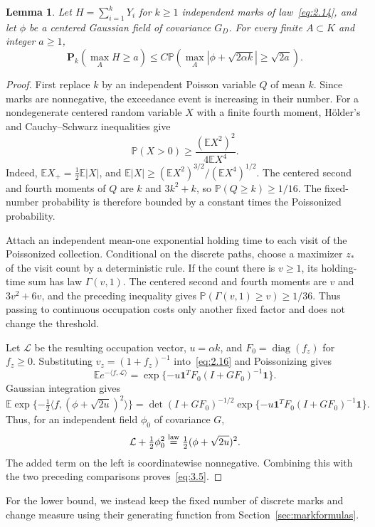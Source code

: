 \documentclass[11pt,letterpaper,reqno]{amsart}
\numberwithin{equation}{section}
\newtheorem{lemma}[theorem]{Lemma}
\theoremstyle{remark}
\begin{document}
\begin{lemma}\label{lem:oneway}
Let $H=\sum_{i=1}^kY_i$ for $k\ge1$ independent marks of law~\eqref{eq:2.14}, and let $\phi$ be a centered Gaussian field of covariance $G_D$. For every finite $A\subset K$ and integer $a\ge1$,
\begin{equation}\label{eq:3.5}
\mathbf P_k(\max_AH\ge a)
\le C\mathbb P\left(\max_A|\phi+\sqrt{2\alpha k}|\ge\sqrt{2a}\right).
\end{equation}
\end{lemma}
\begin{proof}
First replace $k$ by an independent Poisson variable $Q$ of mean $k$. Since marks are nonnegative, the exceedance event is increasing in their number. For a nondegenerate centered random variable $X$ with a finite fourth moment, H\"older's and Cauchy--Schwarz inequalities give
\[
\mathbb P(X>0)\ge
\frac{(\mathbb E X^2)^2}{4\mathbb E X^4}.
\]
Indeed, $\mathbb E X_+=\tfrac12\mathbb E|X|$, and
$\mathbb E|X|\ge(\mathbb E X^2)^{3/2}/(\mathbb E X^4)^{1/2}$.
The centered second and fourth moments of $Q$ are $k$ and $3k^2+k$, so $\mathbb P(Q\ge k)\ge1/16$. The fixed-number probability is therefore bounded by a constant times the Poissonized probability.

Attach an independent mean-one exponential holding time to each visit of the Poissonized collection. Conditional on the discrete paths, choose a maximizer $z_*$ of the visit count by a deterministic rule. If the count there is $v\ge1$, its holding-time sum has law $\Gamma(v,1)$. The centered second and fourth moments are $v$ and $3v^2+6v$, and the preceding inequality gives $\mathbb P(\Gamma(v,1)\ge v)\ge1/36$. Thus passing to continuous occupation costs only another fixed factor and does not change the threshold.

Let $\mathcal L$ be the resulting occupation vector, $u=\alpha k$, and $F_0=\operatorname{diag}(f_z)$ for $f_z\ge0$. Substituting $v_z=(1+f_z)^{-1}$ into~\eqref{eq:2.16} and Poissonizing gives
\begin{equation}\label{eq:3.6}
\mathbb E e^{-\langle f,\mathcal L\rangle}
=\exp\{-u\mathbf1^TF_0(I+GF_0)^{-1}\mathbf1\}.
\end{equation}
Gaussian integration gives
\[
\mathbb E\exp\{-\tfrac12\langle f,(\phi+\sqrt{2u})^2\rangle\}
=\det(I+GF_0)^{-1/2}
\exp\{-u\mathbf1^TF_0(I+GF_0)^{-1}\mathbf1\}.
\]
Thus, for an independent field $\phi_0$ of covariance $G$,
\begin{equation}\label{eq:3.7}
\mathcal L+\tfrac12\phi_0^2
\overset{\rm law}=\tfrac12(\phi+\sqrt{2u})^2.
\end{equation}
The added term on the left is coordinatewise nonnegative. Combining this with the two preceding comparisons proves~\eqref{eq:3.5}.
\end{proof}
For the lower bound, we instead keep the fixed number of discrete marks and change measure using their generating function from Section~\ref{sec:markformulas}.
\end{document}
